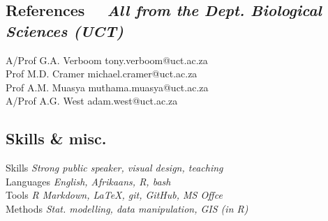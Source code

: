\documentclass[10pt]{article}
\begin{document}
\hrulefill

\begin{multicols}{2}

\subsection*{References %
  ~~{\small \textmd{\textit{All from the Dept. Biological Sciences (UCT)}}}}

A/Prof G.A. Verboom                             \hfill tony.verboom@uct.ac.za \\
Prof M.D. Cramer                              \hfill michael.cramer@uct.ac.za \\
Prof A.M. Muasya                              \hfill muthama.muasya@uct.ac.za \\
A/Prof A.G. West                                      \hfill adam.west@uct.ac.za

\columnbreak

\subsection*{Skills \& misc.} %


Skills         \hfill \textit{Strong public speaker, visual design, teaching} \\
Languages                         \hfill \textit{English, Afrikaans, R, bash} \\
Tools                \hfill \textit{R Markdown, LaTeX, git, GitHub, MS Offce} \\
Methods           \hfill \textit{Stat. modelling, data manipulation, GIS (in R)}

\end{multicols}
\end{document}
